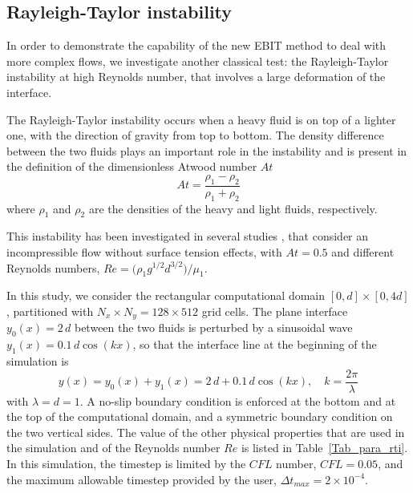 \subsection{Rayleigh-Taylor instability}

In order to demonstrate the capability of the new EBIT method to deal with more complex flows, we investigate another classical test: the Rayleigh-Taylor instability at high Reynolds number, that involves a large deformation of the interface. 

The Rayleigh-Taylor instability occurs when a heavy fluid is on top of a lighter one, with the direction of gravity from top to bottom. The density difference between the two fluids plays an important role in the instability and is present in the definition of the dimensionless Atwood number $At$
\begin{equation}
At = \frac{\rho_1 - \rho_2}{\rho_1 + \rho_2}
\end{equation}
where $\rho_1$ and $\rho_2$ are the densities of the heavy and light fluids, respectively.

This instability has been investigated in several studies \cite{Tryggvason_1988_75, Guermond_2000_165, Ding_2007_226}, that consider an incompressible flow without surface tension effects, with $At = 0.5$ and different Reynolds numbers,
$Re = \big( \rho_1 g^{1/2} d^{3/2} \big) \big/ \mu_1$.

In this study, we consider the rectangular computational domain $[0, d] \times [0, 4d]$, partitioned with $N_x \times N_y = 128 \times 512$ grid cells. The plane interface $y_0(x) = 2\,d$ between the two fluids is perturbed by a sinusoidal wave $y_1(x) = 0.1\,d \cos (k x)$, so that the interface line at the beginning of the simulation is
\begin{equation}
y (x) = y_0 (x) + y_1 (x) = 2\,d + 0.1\,d \cos (k x), \quad k = \frac{2\pi}{\lambda}
\end{equation}
with $\lambda = d = 1$.
A no-slip boundary condition is enforced at the bottom and at the top of the computational domain, and a symmetric boundary condition on the two vertical sides. 
The value of the other physical properties that are used in the simulation and of the Reynolds number $Re$ is listed in Table~\ref{Tab_para_rti}. In this simulation, the timestep is limited by the $CFL$ number, $CFL=0.05$, and the maximum allowable timestep provided by the user, $\Delta t_{max} = 2 \times 10^{-4}$.

